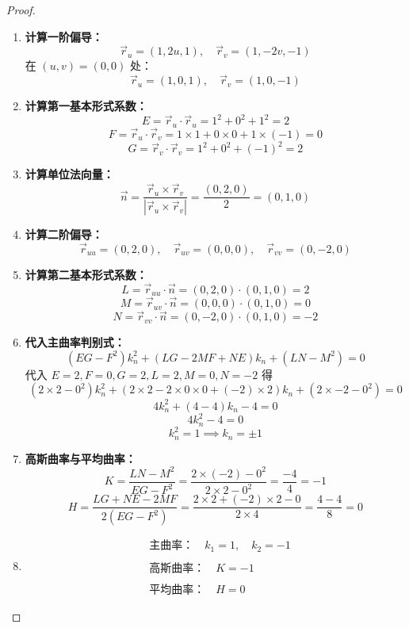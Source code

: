 \documentclass[lang=cn,10pt,thmcnt=section]{elegantbook}
\begin{document}
\begin{proof}
    \begin{enumerate}
        \item \textbf{计算一阶偏导：}
        \[
        \vec{r}_u = (1, 2u, 1), \quad \vec{r}_v = (1, -2v, -1)
        \]
        在 $(u,v) = (0,0)$ 处：
        \[
        \vec{r}_u = (1, 0, 1), \quad \vec{r}_v = (1, 0, -1)
        \]

        \item \textbf{计算第一基本形式系数：}
        \[
        E = \vec{r}_u \cdot \vec{r}_u = 1^2 + 0^2 + 1^2 = 2
        \]
        \[
        F = \vec{r}_u \cdot \vec{r}_v = 1 \times 1 + 0 \times 0 + 1 \times (-1) = 0
        \]
        \[
        G = \vec{r}_v \cdot \vec{r}_v = 1^2 + 0^2 + (-1)^2 = 2
        \]

        \item \textbf{计算单位法向量：}
        \[
        \vec{n} = \frac{\vec{r}_u \times \vec{r}_v}{|\vec{r}_u \times \vec{r}_v|} = \frac{(0, 2, 0)}{2} = (0, 1, 0)
        \]

        \item \textbf{计算二阶偏导：}
        \[
        \vec{r}_{uu} = (0, 2, 0), \quad \vec{r}_{uv} = (0, 0, 0), \quad \vec{r}_{vv} = (0, -2, 0)
        \]

        \item \textbf{计算第二基本形式系数：}
        \[
        L = \vec{r}_{uu} \cdot \vec{n} = (0, 2, 0) \cdot (0, 1, 0) = 2
        \]
        \[
        M = \vec{r}_{uv} \cdot \vec{n} = (0, 0, 0) \cdot (0, 1, 0) = 0
        \]
        \[
        N = \vec{r}_{vv} \cdot \vec{n} = (0, -2, 0) \cdot (0, 1, 0) = -2
        \]

        \item \textbf{代入主曲率判别式：}
        \[
        (EG - F^2)k_n^2 + (LG - 2MF + NE)k_n + (LN - M^2) = 0
        \]
        代入 $E=2, F=0, G=2, L=2, M=0, N=-2$ 得
        \[
        (2 \times 2 - 0^2)k_n^2 + (2 \times 2 - 2 \times 0 \times 0 + (-2) \times 2)k_n + (2 \times -2 - 0^2) = 0
        \]
        \[
        4k_n^2 + (4 - 4)k_n - 4 = 0
        \]
        \[
        4k_n^2 - 4 = 0
        \]
        \[
        k_n^2 = 1 \implies k_n = \pm 1
        \]

        \item \textbf{高斯曲率与平均曲率：}
        \[
        K = \frac{LN - M^2}{EG - F^2} = \frac{2 \times (-2) - 0^2}{2 \times 2 - 0^2} = \frac{-4}{4} = -1
        \]
        \[
        H = \frac{LG + NE - 2MF}{2(EG - F^2)} = \frac{2 \times 2 + (-2) \times 2 - 0}{2 \times 4} = \frac{4 - 4}{8} = 0
        \]

        \item 
        \[
        \boxed{
            \begin{aligned}
                &\text{主曲率：} \quad k_1 = 1,\quad k_2 = -1 \\\\
                &\text{高斯曲率：} \quad K = -1 \\\\
                &\text{平均曲率：} \quad H = 0
            \end{aligned}
        }
        \]
    \end{enumerate}
\end{proof}
\end{document}
